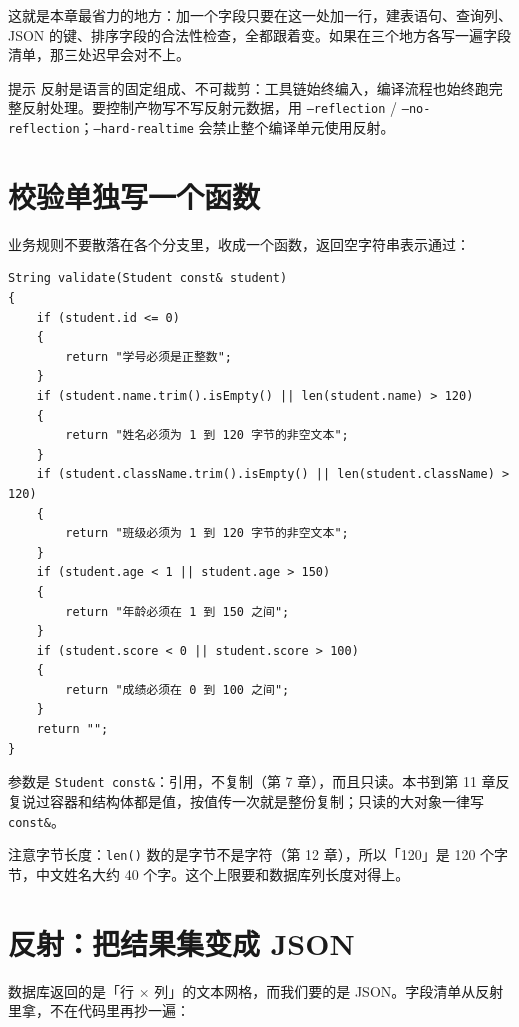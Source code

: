 这就是本章最省力的地方：加一个字段只要在这一处加一行，建表语句、查询列、JSON 的键、排序字段的合法性检查，全都跟着变。如果在三个地方各写一遍字段清单，那三处迟早会对不上。

\begin{tip}{提示}
反射是语言的固定组成、不可裁剪：工具链始终编入，编译流程也始终跑完整反射处理。要控制产物写不写反射元数据，用 \texttt{--reflection} / \texttt{--no-reflection}；\texttt{--hard-realtime} 会禁止整个编译单元使用反射。
\end{tip}

\section{校验单独写一个函数}

业务规则不要散落在各个分支里，收成一个函数，返回空字符串表示通过：

\par
\medskip
\begin{lstlisting}[style=chali]
String validate(Student const& student)
{
    if (student.id <= 0)
    {
        return "学号必须是正整数";
    }
    if (student.name.trim().isEmpty() || len(student.name) > 120)
    {
        return "姓名必须为 1 到 120 字节的非空文本";
    }
    if (student.className.trim().isEmpty() || len(student.className) > 120)
    {
        return "班级必须为 1 到 120 字节的非空文本";
    }
    if (student.age < 1 || student.age > 150)
    {
        return "年龄必须在 1 到 150 之间";
    }
    if (student.score < 0 || student.score > 100)
    {
        return "成绩必须在 0 到 100 之间";
    }
    return "";
}
\end{lstlisting}
\par
\medskip

参数是 \texttt{Student const\&}：引用，不复制（第 7 章），而且只读。本书到第 11 章反复说过容器和结构体都是值，按值传一次就是整份复制；只读的大对象一律写 \texttt{const\&}。

注意字节长度：\texttt{len(\allowbreak{})\allowbreak{}} 数的是字节不是字符（第 12 章），所以「120」是 120 个字节，中文姓名大约 40 个字。这个上限要和数据库列长度对得上。

\section{反射：把结果集变成 JSON}

数据库返回的是「行 \ensuremath{\times} 列」的文本网格，而我们要的是 JSON。字段清单从反射里拿，不在代码里再抄一遍：

